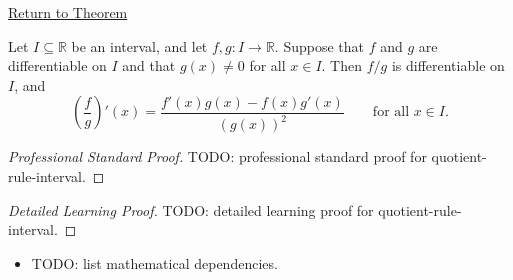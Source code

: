 \newpage
{}
\label{prf:quotient-rule-interval}

\begin{remark*}[Return]
\hyperref[thm:quotient-rule-interval]{Return to Theorem}
\end{remark*}

\begin{theorem*}
Let $I \subseteq \mathbb{R}$ be an interval, and let $f, g : I \to \mathbb{R}$. Suppose that $f$ and $g$ are differentiable on $I$ and that $g(x) \neq 0$ for all $x \in I$. Then $f/g$ is differentiable on $I$, and
\[
\left(\frac{f}{g}\right)'(x) = \frac{f'(x)g(x) - f(x)g'(x)}{(g(x))^2} \qquad \text{for all } x \in I.
\]
\end{theorem*}

\begin{proof}[Professional Standard Proof]
\LRAProofBodyStart
TODO: professional standard proof for quotient-rule-interval.
\end{proof}

\begin{proof}[Detailed Learning Proof]
\LRAProofBodyStart
TODO: detailed learning proof for quotient-rule-interval.
\end{proof}

\begin{remark*}
\end{remark*}

\begin{dependencies}
\begin{itemize}
  \item TODO: list mathematical dependencies.
\end{itemize}
\end{dependencies}

\clearpage
